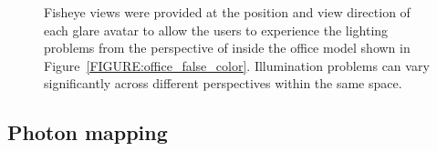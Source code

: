 \documentclass[10pt,twocolumn,letterpaper]{article}
\begin{document}
\begin{figure}[t]
\caption{Fisheye views were provided at the position and view
  direction of each glare avatar to allow the users to experience the
  lighting problems from the perspective of inside the office model shown in Figure~\ref{FIGURE:office_false_color}.
  Illumination problems can vary significantly across different
  perspectives within the same space.}
\vspace{-0.15in}
\label{FIGURE:fisheyes}
\end{figure}

\subsection{Photon mapping}
\end{document}
